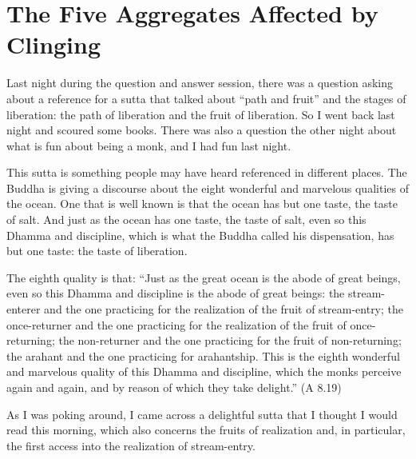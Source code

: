 \chapter{The Five Aggregates Affected by
Clinging}

Last night during the question and answer session, there was a question
asking about a reference for a sutta that talked about “path and fruit”
and the stages of liberation: the path of liberation and the fruit of
liberation. So I went back last night and scoured some books. There was
also a question the other night about what is fun about being a monk,
and I had fun last night.

This sutta is something people may have heard referenced in different
places. The Buddha is giving a discourse about the eight wonderful and
marvelous qualities of the ocean. One that is well known is that the
ocean has but one taste, the taste of salt. And just as the ocean has
one taste, the taste of salt, even so this Dhamma and discipline, which
is what the Buddha called his dispensation, has but one taste: the taste
of liberation.

The eighth quality is that: “Just as the great ocean is the abode of
great beings, even so this Dhamma and discipline is the abode of great
beings: the stream-enterer and the one practicing for the realization of
the fruit of stream-entry; the once-returner and the one practicing for
the realization of the fruit of once-returning; the non-returner and the
one practicing for the fruit of non-returning; the arahant and the one
practicing for arahantship. This is the eighth wonderful and marvelous
quality of this Dhamma and discipline, which the monks perceive again
and again, and by reason of which they take delight.” (A 8.19)

As I was poking around, I came across a delightful sutta that I thought
I would read this morning, which also concerns the fruits of realization
and, in particular, the first access into the realization of
stream-entry.

